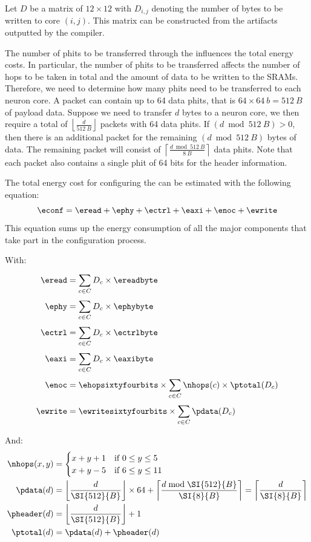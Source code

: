 Let $D$ be a matrix of $12 \times 12$ with $D_{i,j}$ denoting the number of bytes to be written to core $\left( i,j \right)$.
This matrix can be constructed from the artifacts outputted by the compiler.

The number of phits to be transferred through the \confignoc{} influences the total energy costs.
In particular, the number of phits to be transferred affects the number of hops to be taken in total and the amount of data to be written to the SRAMs.
Therefore, we need to determine how many phits need to be transferred to each neuron core.
A packet can contain up to 64 data phits, that is $64 \times \SI{64}{b} = \SI{512}{B}$ of payload data.
Suppose we need to transfer $d$ bytes to a neuron core, we then require a total of $\left\lfloor \frac{d}{\SI{512}{B}} \right\rfloor$ packets with 64 data phits.
If $\left( d \bmod \SI{512}{B} \right) > 0$, then there is an additional packet for the remaining $\left( d \bmod \SI{512}{B} \right)$ bytes of data.
The remaining packet will consist of $\left\lceil \frac{d \bmod \SI{512}{B}}{\SI{8}{B}}\right\rceil$ data phits.
Note that each packet also contains a single phit of 64 bits for the header information.

The total energy cost for configuring the \graicore{} can be estimated with the following equation:
\begin{equation}
    \econf = \eread + \ephy + \ectrl + \eaxi + \enoc + \ewrite
\end{equation}
This equation sums up the energy consumption of all the major components that take part in the configuration process.

With:
\begin{align*} 
\eread &= 
    \sum_{c \in C}^{} D_c \times \ereadbyte \\
\ephy &=
    \sum_{c \in C}^{} D_c \times \ephybyte \\
\ectrl &=
    \sum_{c \in C}^{} D_c \times \ectrlbyte \\
\eaxi &=
    \sum_{c \in C}^{} D_c \times \eaxibyte \\
\enoc &=
    \ehopsixtyfourbits \times \sum_{c \in C}^{}{\nhops(c) \times \ptotal(D_c)} \\
\ewrite &=
    \ewritesixtyfourbits \times \sum_{c \in C}^{}{\pdata(D_c)}
\end{align*}

And:
\begin{align*} 
\nhops(x,y) &=
    \begin{cases} 
        x + y + 1 & \textrm{if } 0 \leq y \leq 5 \\
        x + y - 5 & \text{if } 6 \leq y \leq 11
    \end{cases}
    \\
    \pdata(d) &=
        \left\lfloor \frac{d}{\SI{512}{B}} \right\rfloor \times 64 + \left\lceil \frac{d \bmod \SI{512}{B}}{\SI{8}{B}} \right\rceil = \left\lceil \frac{d}{\SI{8}{B}} \right\rceil
    \\
    \pheader(d) &=
        \left\lfloor \frac{d}{\SI{512}{B}} \right\rfloor + 1
    \\
    \ptotal(d) &=
        \pdata(d) + \pheader(d)
\end{align*}

